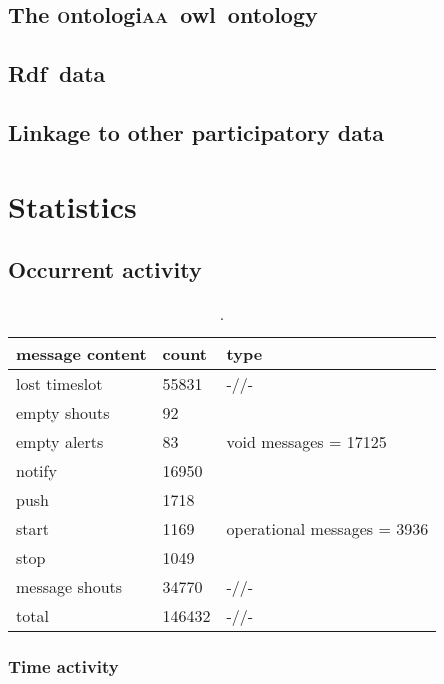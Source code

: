 \documentclass[a4paper, 11pt]{article} %
\newcommand{\ontologiaa}{\textsc{o}ntologi\textsc{aa}}
\newcommand{\owl}{{\sc owl}}
\newcommand{\rdfi}{{\sc Rdf}}
\begin{document}
\subsection{The \ontologiaa\ \owl\ ontology}

\subsection{\rdfi\ data}

\subsection{Linkage to other participatory data}


\section{Statistics}\label{sec:stats}
\subsection{Occurrent activity}

\begin{table}[!h]
  \centering
  \caption{.}\label{tab:msgTy}
  \begin{tabular}{|l|l|l|}\hline
      {\bf message content } & {\bf count} & {\bf type}   \\\hline\hline
      lost timeslot & 55831 & -//- \\ \hline\hline
 empty shouts & 92    & \multirow{3}{*}{void messages = 17125} \\
 empty alerts & 83        &  \\
       notify & 16950     &  \\ \hline\hline
 push & 1718 & \multirow{3}{*}{operational messages = 3936 } \\ 
start & 1169 & \\ 
 stop & 1049 & \\ \hline
      message shouts & 34770 & -//- \\ \hline
      total & 146432 & -//- \\\hline
  \end{tabular}
\end{table}

\subsubsection{Time activity}
\end{document}
